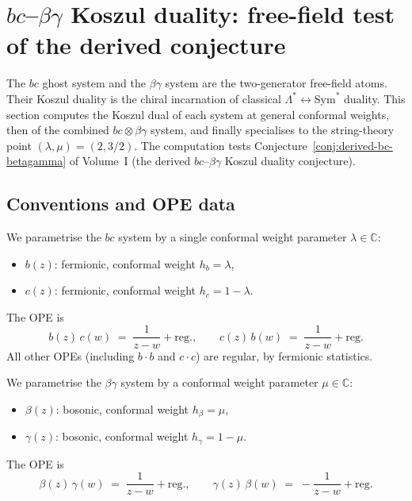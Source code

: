 \documentclass[11pt]{article}
\newcommand{\C}{\mathbb{C}}
\begin{document}
\section{$bc$--$\beta\gamma$ Koszul duality: free-field test of the derived conjecture}
\label{sec:bc-betagamma-koszul}

The $bc$ ghost system and the $\beta\gamma$ system are the
two-generator free-field atoms.  Their Koszul duality is the
chiral incarnation of classical $\Lambda^* \leftrightarrow
\mathrm{Sym}^*$ duality.  This section computes the Koszul
dual of each system at general conformal weights, then
of the combined $bc \otimes \beta\gamma$ system, and finally
specialises to the string-theory point $(\lambda, \mu) =
(2, 3/2)$.  The computation tests
Conjecture~\ref*{conj:derived-bc-betagamma} of Volume~I
(the derived $bc$--$\beta\gamma$ Koszul duality conjecture).

\subsection{Conventions and OPE data}

We parametrise the $bc$ system by a single conformal weight
parameter $\lambda \in \C$:
\begin{itemize}
\item $b(z)$: fermionic, conformal weight $h_b = \lambda$,
\item $c(z)$: fermionic, conformal weight $h_c = 1 - \lambda$.
\end{itemize}
The OPE is
\begin{equation}\label{eq:bc-ope-general}
b(z)\,c(w) \;=\; \frac{1}{z-w} + \text{reg.},
\qquad
c(z)\,b(w) \;=\; \frac{1}{z-w} + \text{reg.}
\end{equation}
All other OPEs (including $b \cdot b$ and $c \cdot c$) are regular,
by fermionic statistics.

We parametrise the $\beta\gamma$ system by a conformal weight
parameter $\mu \in \C$:
\begin{itemize}
\item $\beta(z)$: bosonic, conformal weight $h_\beta = \mu$,
\item $\gamma(z)$: bosonic, conformal weight $h_\gamma = 1 - \mu$.
\end{itemize}
The OPE is
\begin{equation}\label{eq:bg-ope-general}
\beta(z)\,\gamma(w) \;=\; \frac{1}{z-w} + \text{reg.},
\qquad
\gamma(z)\,\beta(w) \;=\; -\frac{1}{z-w} + \text{reg.}
\end{equation}
\end{document}
